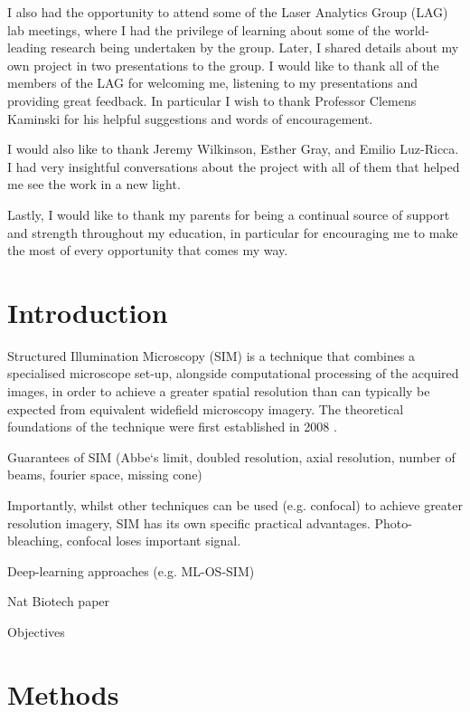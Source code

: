 \documentclass[12pt]{article}
\begin{document}
I also had the opportunity to attend some of the Laser Analytics Group (LAG) lab meetings,
where I had the privilege of learning about some of the world-leading research being undertaken by the group.
Later, I shared details about my own project in two presentations to the group.
I would like to thank all of the members of the LAG for welcoming me, listening to my presentations and providing great feedback.
In particular I wish to thank Professor Clemens Kaminski for his helpful suggestions and words of encouragement.

I would also like to thank Jeremy Wilkinson, Esther Gray, and Emilio Luz-Ricca.
I had very insightful conversations about the project with all of them that helped me see the work in a new light.

Lastly, I would like to thank my parents for being a continual source of support and strength throughout my education,
in particular for encouraging me to make the most of every opportunity that comes my way.


\newpage
\tableofcontents

\newpage
{}
\section{Introduction}

Structured Illumination Microscopy (SIM) is a technique that combines a specialised microscope set-up,
alongside computational processing of the acquired images,
in order to achieve a greater spatial resolution than can typically be expected from equivalent widefield microscopy imagery.
The theoretical foundations of the technique were first established in 2008 \cite{originalSIM}.




Guarantees of SIM (Abbe`s limit, doubled resolution, axial resolution, number of beams, fourier space, missing cone)

Importantly, whilst other techniques can be used (e.g. confocal) to achieve greater resolution imagery, SIM has its own specific practical advantages.
Photo-bleaching, confocal loses important signal.

Deep-learning approaches (e.g. ML-OS-SIM)

Nat Biotech paper \cite{keypaper}

Objectives

\section{Methods}
\end{document}
